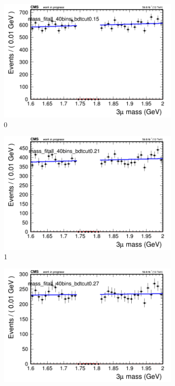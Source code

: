 \begin{figure}[h!]
    \centering
    \begin{subfigure}{0.2\textwidth}
        \includegraphics[width=\textwidth]{power_law/plots/all/massfit_all_40bins_bdtcut0.15.png}
        \caption{0}
    \end{subfigure}
    \begin{subfigure}{0.2\textwidth}
        \includegraphics[width=\textwidth]{power_law/plots/all/massfit_all_40bins_bdtcut0.21.png}
        \caption{1}
    \end{subfigure}
    \begin{subfigure}{0.2\textwidth}
        \includegraphics[width=\textwidth]{power_law/plots/all/massfit_all_40bins_bdtcut0.27.png}

\end{subfigure}
\end{figure}
